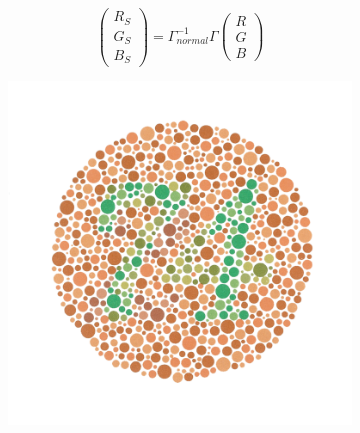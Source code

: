 \documentclass{sig-alternate-05-2015}
\begin{document}
\begin{equation}
    \begin{pmatrix}
        R_S \\ G_S \\ B_S
    \end{pmatrix}
    =
    \Gamma_{normal}^{-1}
    \Gamma
    \begin{pmatrix}
        R \\ G \\ B
    \end{pmatrix}
\end{equation}

\begin{figure}
    \begin{subfigure}[t]{0.5\columnwidth}
        \includegraphics[width=\textwidth]{74.png}
    \end{subfigure}
    \begin{subfigure}[t]{0.5\columnwidth}

\end{subfigure}
\end{figure}
\end{document}
